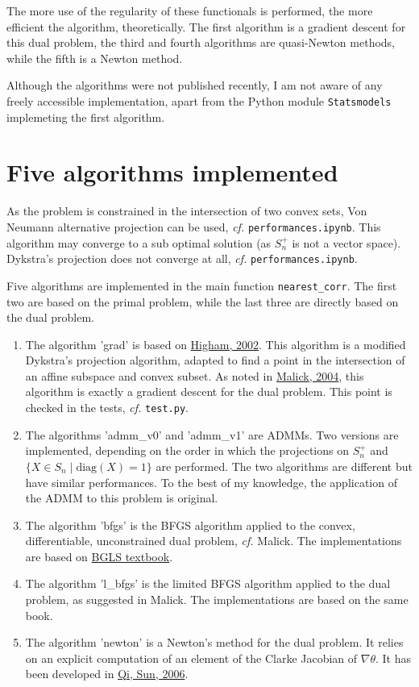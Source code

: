 \documentclass{article}
\begin{document}
\medskip

The more use of the regularity of these functionals is performed, the more efficient the algorithm, theoretically. The first algorithm is a gradient descent for this dual problem, the third and fourth algorithms are quasi-Newton methods, while the fifth is a Newton method.

\medskip

Although the algorithms were not published recently, I am not aware of any freely accessible implementation,
apart from the Python module \texttt{Statsmodels} implemeting the first algorithm.

\section{Five algorithms implemented}

As the problem is constrained in the intersection of two convex sets, Von Neumann alternative projection can be used, \emph{cf.} \texttt{performances.ipynb}. This algorithm may converge to a sub optimal solution (as $S_n^+$ is not a vector space). Dykstra's projection does not converge at all, \emph{cf.} \texttt{performances.ipynb}.

\medskip

Five algorithms are implemented in the main function \texttt{nearest\_corr}. The first two are based on the primal problem, while the last three are directly based on the dual problem.
\begin{enumerate}
\item The algorithm 'grad' is based on \href{https://www.maths.manchester.ac.uk/~higham/narep/narep369.pdf}{Higham, 2002}.
This algorithm is a modified Dykstra's projection algorithm, adapted to find a point in the intersection of an affine subspace and convex subset. As noted in \href{https://hal.inria.fr/inria-00072409v2/document}{Malick, 2004}, this algorithm is exactly a gradient descent for the dual problem. This point is checked in the tests, \emph{cf.} \texttt{test.py}.
\item The algorithms 'admm\_v0' and 'admm\_v1' are ADMMs. Two versions are implemented, depending on the order in which the projections on $S_n^+$ and $\{X\in S_n \mid \mathrm{diag}(X) = 1\}$ are performed. The two algorithms are different but have similar performances. To the best of my knowledge, the application of the ADMM to this problem is original.
\item The algorithm 'bfgs' is the BFGS algorithm applied to the convex, differentiable, unconstrained dual problem, \emph{cf.} Malick. The implementations are based on \href{https://link.springer.com/book/10.1007/978-3-540-35447-5}{BGLS textbook}.
\item The algorithm 'l\_bfgs' is the limited BFGS algorithm applied to the dual problem, as suggested in Malick. The implementations are based on the same book.
\item The algorithm 'newton' is a Newton's method for the dual problem. It relies on an explicit computation of an element of the Clarke Jacobian of $\nabla \theta$. It has been developed in \href{http://www.personal.soton.ac.uk/hdqi/REPORTS/simax_06.pdf}{Qi, Sun, 2006}.
\end{enumerate}
\end{document}
